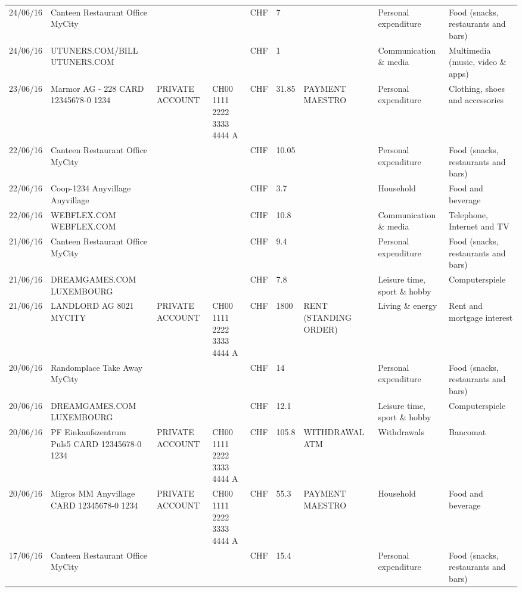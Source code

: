\begin{landscape}
\begin{adjustwidth}{-2cm}{-2cm}
\begin{tiny}
\begin{longtable}{lp{4cm}llllp{3cm}ll}
		24/06/16 & Canteen Restaurant Office      MyCity &       &       & CHF   & 7     &       & Personal expenditure & Food (snacks, restaurants and bars) \\
		24/06/16 & UTUNERS.COM/BILL          UTUNERS.COM &       &       & CHF   & 1     &       & Communication \& media & Multimedia (music, video \& apps) \\
		23/06/16 & Marmor AG - 228 CARD 12345678-0 1234 & PRIVATE ACCOUNT & CH00 1111 2222 3333 4444 A & CHF   & 31.85 & PAYMENT MAESTRO & Personal expenditure & Clothing, shoes and accessories \\
		22/06/16 & Canteen Restaurant Office      MyCity &       &       & CHF   & 10.05 &       & Personal expenditure & Food (snacks, restaurants and bars) \\
		22/06/16 & Coop-1234 Anyvillage    Anyvillage &       &       & CHF   & 3.7   &       & Household & Food and beverage \\
		22/06/16 & WEBFLEX.COM              WEBFLEX.COM &       &       & CHF   & 10.8  &       & Communication \& media & Telephone,  Internet and TV \\
		21/06/16 & Canteen Restaurant Office      MyCity &       &       & CHF   & 9.4   &       & Personal expenditure & Food (snacks, restaurants and bars) \\
		21/06/16 & DREAMGAMES.COM           LUXEMBOURG &       &       & CHF   & 7.8   &       & Leisure time, sport \& hobby & Computerspiele \\
		21/06/16 & LANDLORD AG 8021 MYCITY & PRIVATE ACCOUNT & CH00 1111 2222 3333 4444 A & CHF   & 1800  & RENT (STANDING ORDER) & Living \& energy & Rent and mortgage interest \\
		20/06/16 & Randomplace Take Away     MyCity &       &       & CHF   & 14    &       & Personal expenditure & Food (snacks, restaurants and bars) \\
		20/06/16 & DREAMGAMES.COM           LUXEMBOURG &       &       & CHF   & 12.1  &       & Leisure time, sport \& hobby & Computerspiele \\
		20/06/16 & PF Einkaufszentrum Puls5 CARD 12345678-0 1234 & PRIVATE ACCOUNT & CH00 1111 2222 3333 4444 A & CHF   & 105.8 & WITHDRAWAL ATM & Withdrawals & Bancomat \\
		20/06/16 & Migros MM Anyvillage CARD 12345678-0 1234 & PRIVATE ACCOUNT & CH00 1111 2222 3333 4444 A & CHF   & 55.3  & PAYMENT MAESTRO & Household & Food and beverage \\
		17/06/16 & Canteen Restaurant Office      MyCity &       &       & CHF   & 15.4  &       & Personal expenditure & Food (snacks, restaurants and bars) \\

\end{longtable}
\end{tiny}
\end{adjustwidth}
\end{landscape}
